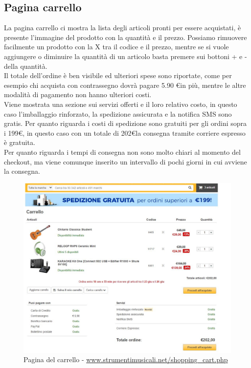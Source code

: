 \documentclass[12pt]{article}
\begin{document}
	\subsection{Pagina carrello}
	\vspace{0.4cm}
	La pagina carrello ci mostra la lista degli articoli pronti per essere acquistati, è presente l'immagine del prodotto con la quantità e il prezzo. Possiamo rimuovere facilmente un prodotto con la X tra il codice e il prezzo, mentre se si vuole aggiungere o diminuire la quantità di un articolo basta premere sui bottoni + e - della quantità.
	\\ Il totale dell'ordine è ben visibile ed ulteriori spese sono riportate, come per esempio chi acquista con contrassegno dovrà pagare 5.90 \euro in più, mentre le altre modalità di pagamento non hanno ulteriori costi. \\Viene mostrata una sezione sui servizi offerti e il loro relativo costo, in questo caso l'imballaggio rinforzato, la spedizione assicurata e la notifica SMS sono gratis. Per quanto riguarda i costi di spedizione sono gratuiti per gli ordini sopra i 199\euro, in questo caso con un totale di 202\euro la consegna tramite corriere espresso è gratuita. 
	\\ Per quanto riguarda i tempi di consegna non sono molto chiari al momento del checkout, ma viene comunque inserito un intervallo di pochi giorni in cui avviene la consegna.
	\begin{figure}
		\centering	
		\includegraphics[width=180mm]{images/carrello.png}
		\caption{Pagina del carrello -  \url{www.strumentimusicali.net/shopping_cart.php}}
	\end{figure}
	\newpage
\end{document}
